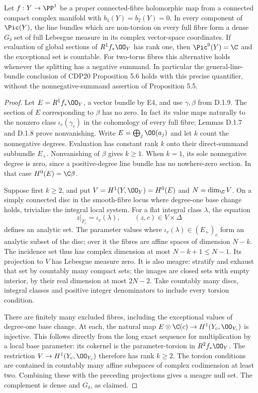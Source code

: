 \begin{proposition}[D.1.11; Proved]\label{st:D.1.11}
Let $f:Y\to\PP^1$ be a proper connected-fibre holomorphic map from
a connected compact complex manifold with $b_1(Y)=b_2(Y)=0$.
In every component of $\Pic(Y)$, the line
bundles which are non-torsion on every full fibre form a dense
$G_\delta$ set of full Lebesgue measure in its complex vector-space
coordinates. If evaluation of global sections of $R^1f_*\OO_Y$
has rank one, then $\Pic^0(Y)=\C$ and the exceptional set is
countable. For two-torus fibres this alternative holds whenever
the splitting has a negative summand.
In particular the general-line-bundle conclusion of CDP20
Proposition 5.6 holds with this precise quantifier, without the
nonnegative-summand assertion of Proposition 5.5.
\end{proposition}
\begin{proof}
Let $E=R^1f_*\OO_Y$, a vector bundle by E4, and use
$\gamma,\beta$ from D.1.9. The section of $E$ corresponding to
$\beta$ has no zero. In fact its value maps naturally to the
nonzero class $\iota_c(\gamma_c)$ in the cohomology of every full
fibre; Lemmas D.1.7 and D.1.8 prove nonvanishing. Write
$E=\bigoplus_j\OO(a_j)$ and let $k$ count the nonnegative degrees.
Evaluation has constant rank $k$ onto their direct-summand subbundle
$E_+$. Nonvanishing of $\beta$ gives $k\geq1$. When $k=1$, its
sole nonnegative degree is zero, since a positive-degree line bundle
has no nowhere-zero section. In that case $H^0(E)=\C\beta$.

Suppose first $k\geq2$, and put $V=H^1(Y,\OO_Y)=H^0(E)$ and
$N=\dim_{\C}V$. On a simply connected disc in the smooth-fibre
locus where degree-one base change holds, trivialize the integral
local system. For a flat integral
class $\lambda$, the equation
\[
z|_{F_c}=\iota_c(\lambda),\qquad (z,c)\in V\times\Delta
\]
defines an analytic set. The parameter values where
$\iota_c(\lambda)\in(E_+)_c$ form an analytic subset of the disc;
over it the fibres are affine spaces of dimension $N-k$.
The incidence set thus has complex dimension at most
$N-k+1\leq N-1$. Its projection to $V$ has Lebesgue
measure zero. It is also meagre: stratify and exhaust that set
by countably many compact sets; the images are closed sets with
empty interior, by their real dimension at most $2N-2$.
Take countably many discs, integral classes and positive integer
denominators to include every torsion condition.

There are finitely many excluded fibres, including the exceptional
values of degree-one base change. At each, the natural map
$E\otimes\C(c)\to H^1(Y_c,\OO_{Y_c})$ is injective. This follows
directly from the long exact sequence for multiplication by a local
base parameter: its cokernel is the parameter-torsion in
$R^2f_*\OO_Y$. The restriction $V\to H^1(Y_c,\OO_{Y_c})$
therefore has rank $k\geq2$. The torsion conditions are contained in
countably many affine subspaces of complex codimension at least
two. Combining these with the preceding projections gives a
meagre null set. The complement is dense and $G_\delta$, as claimed.


\end{proof}
